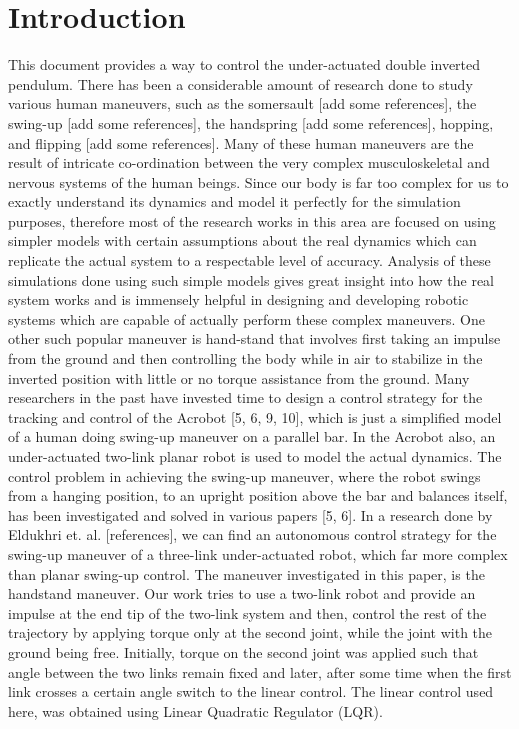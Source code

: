 \documentclass[conference]{IEEEtran}
\begin{document}
\section{Introduction}
This document provides a way to control the under-actuated double inverted pendulum. There has been a considerable amount of research done to study various human maneuvers, such as the somersault [add some references], the swing-up [add some references], the handspring [add some references], hopping, and flipping [add some references]. Many of these human maneuvers are the result of intricate co-ordination between the very complex musculoskeletal and nervous systems of the human beings. Since our body is far too complex for us to exactly understand its dynamics and model it perfectly for the simulation purposes, therefore most of the research works in this area are focused on using simpler models with certain assumptions about the real dynamics which can replicate the actual system to a respectable level of accuracy. Analysis of these simulations done using such simple models gives great insight into how the real system works and is immensely helpful in designing and developing robotic systems which are capable of actually perform these complex maneuvers. One other such popular maneuver is hand-stand that involves first taking an impulse from the ground and then controlling the body while in air to stabilize in the inverted position with little or no torque assistance from the ground. Many researchers in the past have invested time to design a control strategy for the tracking and control of the Acrobot [5, 6, 9, 10], which is just a simplified model of a human doing swing-up maneuver on a parallel bar. In the Acrobot also, an under-actuated two-link planar robot is used to model the actual dynamics. The control problem in achieving the swing-up maneuver, where the robot swings from a hanging position, to an upright position above the bar and balances itself, has been investigated and solved in various papers [5, 6]. In a research done by Eldukhri et. al. [references], we can find an autonomous control strategy for the swing-up maneuver of a three-link under-actuated robot, which far more complex than planar swing-up control.
The maneuver investigated in this paper, is the handstand maneuver. Our work tries to use a two-link robot and provide an impulse at the end tip of the two-link system and then, control the rest of the trajectory by applying torque only at the second joint, while the joint with the ground being free. Initially, torque on the second joint was applied such that angle between the two links remain fixed and later, after some time when the first link crosses a certain angle switch to the linear control. The linear control used here, was obtained using Linear Quadratic Regulator (LQR).
\end{document}
